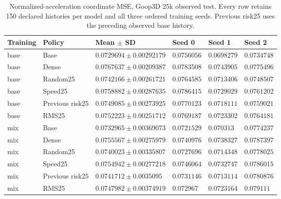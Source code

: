 \begin{table}[p]
\centering\scriptsize
\caption{Normalized-acceleration coordinate MSE, Goop3D 25k observed test. Every row retains 150 declared histories per model and all three ordered training seeds. Previous risk25 uses the preceding observed base history.}
\label{tab:goop3d25k-observed-normalized-test}
\setlength{\tabcolsep}{3pt}
\begin{tabular}{llllll}
\toprule
Training & Policy & Mean $\pm$ SD & Seed 0 & Seed 1 & Seed 2\\
\midrule
base & Base & $0.0729694\pm0.00292179$ & $0.0756056$ & $0.0698279$ & $0.0734748$\\
base & Dense & $0.0767637\pm0.00209387$ & $0.0783508$ & $0.0743905$ & $0.0775496$\\
base & Random25 & $0.0742166\pm0.00261721$ & $0.0764585$ & $0.0713406$ & $0.0748507$\\
base & Speed25 & $0.0758882\pm0.00287635$ & $0.0786415$ & $0.0729029$ & $0.0761202$\\
base & Previous risk25 & $0.0749085\pm0.00273925$ & $0.0770123$ & $0.0718111$ & $0.0759021$\\
base & RMS25 & $0.0752223\pm0.00251712$ & $0.0769187$ & $0.0723302$ & $0.0764181$\\
mix & Base & $0.0732965\pm0.00369073$ & $0.0721529$ & $0.070313$ & $0.0774237$\\
mix & Dense & $0.0755567\pm0.00275979$ & $0.0740976$ & $0.0738327$ & $0.0787397$\\
mix & Random25 & $0.0740023\pm0.00335807$ & $0.0727696$ & $0.0714348$ & $0.0778025$\\
mix & Speed25 & $0.0754942\pm0.00277218$ & $0.0746064$ & $0.0732747$ & $0.0786015$\\
mix & Previous risk25 & $0.0741712\pm0.0035095$ & $0.0731146$ & $0.0713114$ & $0.0780876$\\
mix & RMS25 & $0.0747982\pm0.00374919$ & $0.072967$ & $0.0723164$ & $0.079111$\\
\bottomrule
\end{tabular}
\end{table}

